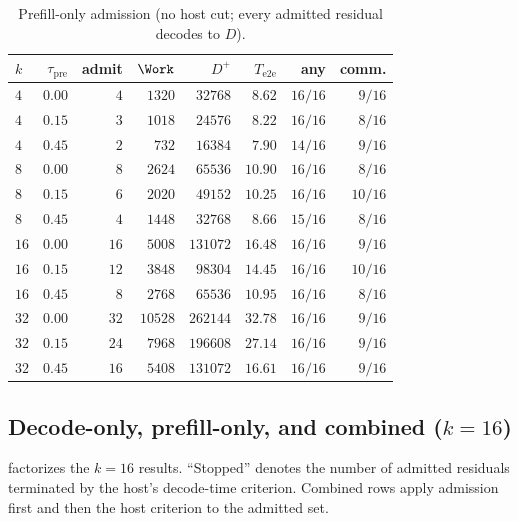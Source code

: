 \begin{table}[t]
\centering
\caption{Prefill-only admission (no host cut; every admitted residual decodes to $D$).}
\label{tab:ablate-prefill}
\scriptsize
\setlength{\tabcolsep}{2.6pt}
\begin{tabular}{@{}lrrrrrrr@{}}
\toprule
$k$ & $\tau_{\mathrm{pre}}$ & admit & $\Work$ & $D^{+}$ & $T_{\mathrm{e2e}}$ & any & comm. \\
\midrule
$4$ & $0.00$ & $4$ & $1320$ & $32768$ & $8.62$ & $16/16$ & $9/16$ \\
\rowcolor{tblalt}
$4$ & $0.15$ & $3$ & $1018$ & $24576$ & $8.22$ & $16/16$ & $8/16$ \\
$4$ & $0.45$ & $2$ & $732$ & $16384$ & $7.90$ & $14/16$ & $9/16$ \\
\midrule
$8$ & $0.00$ & $8$ & $2624$ & $65536$ & $10.90$ & $16/16$ & $8/16$ \\
\rowcolor{tblalt}
$8$ & $0.15$ & $6$ & $2020$ & $49152$ & $10.25$ & $16/16$ & $10/16$ \\
$8$ & $0.45$ & $4$ & $1448$ & $32768$ & $8.66$ & $15/16$ & $8/16$ \\
\midrule
$16$ & $0.00$ & $16$ & $5008$ & $131072$ & $16.48$ & $16/16$ & $9/16$ \\
\rowcolor{tblalt}
$16$ & $0.15$ & $12$ & $3848$ & $98304$ & $14.45$ & $16/16$ & $10/16$ \\
$16$ & $0.45$ & $8$ & $2768$ & $65536$ & $10.95$ & $16/16$ & $8/16$ \\
\midrule
$32$ & $0.00$ & $32$ & $10528$ & $262144$ & $32.78$ & $16/16$ & $9/16$ \\
\rowcolor{tblalt}
$32$ & $0.15$ & $24$ & $7968$ & $196608$ & $27.14$ & $16/16$ & $9/16$ \\
$32$ & $0.45$ & $16$ & $5408$ & $131072$ & $16.61$ & $16/16$ & $9/16$ \\
\bottomrule
\end{tabular}
\end{table}

\subsection{Decode-only, prefill-only, and combined ($k{=}16$)}
\label{sec:ablate-combine}

 factorizes the $k{=}16$ results.
``Stopped'' denotes the number of admitted residuals terminated by the host's decode-time criterion.
Combined rows apply admission first and then the host criterion to the admitted set.

